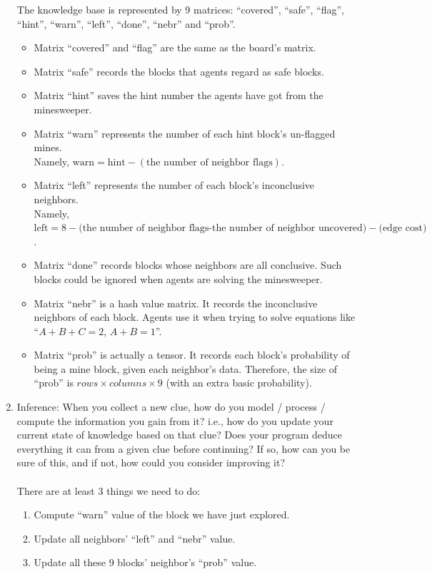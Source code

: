 \documentclass[letter]{article}
\begin{document}
\begin{enumerate}
	The knowledge base is represented by 9 matrices: “covered”, “safe”, “flag”, “hint”, “warn”, “left”, “done”, “nebr” and “prob”. 
	\begin{itemize}
		\item {Matrix “covered” and “flag” are the same as the board’s matrix.}
		\item {Matrix “safe” records the blocks that agents regard as safe blocks.}
		\item {Matrix “hint” saves the hint number the agents have got from the minesweeper.}
		\item {Matrix “warn” represents the number of each hint block’s un-flagged mines. \\ Namely, $ \text{warn} = \text{hint} - (\text{the number of neighbor flags}) $.}
		\item {Matrix “left” represents the number of each block’s inconclusive neighbors. \\ Namely, $ \text{left} = 8 - \text{(the number of neighbor flags-the number of neighbor uncovered)} - \text{(edge cost)} $.}
		\item {Matrix “done” records blocks whose neighbors are all conclusive. Such blocks could be ignored when agents are solving the minesweeper.}
		\item {Matrix “nebr” is a hash value matrix. It records the inconclusive neighbors of each block. Agents use it when trying to solve equations like “$ A+B+C=2 $, $ A+B=1 $”.}
		\item {Matrix “prob” is actually a tensor. It records each block’s probability of being a mine block, given each neighbor’s data. Therefore, the size of “prob” is $ rows \times columns \times 9 $ (with an extra basic probability).}
	\end{itemize}         
	
	\item {Inference: When you collect a new clue, how do you model / process / compute the information you gain from it? i.e., how do you update your current state of knowledge based on that clue? Does your program deduce everything it can from a given clue before continuing? If so, how can you be sure of this, and if not, how could you consider improving it?} \\
	\\
	There are at least 3 things we need to do:
	\begin{enumerate}
		\item {Compute “warn” value of the block we have just explored.}
		\item {Update all neighbors’ “left” and “nebr” value.}
		\item {Update all these 9 blocks’ neighbor’s “prob” value.}
	\end{enumerate}
	

\end{enumerate}
\end{document}
